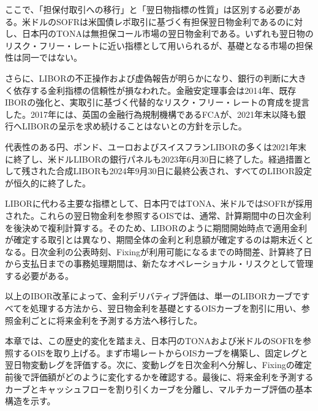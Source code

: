 \documentclass[
  letterpaper,
  DIV=11,
  numbers=noendperiod]{scrreprt}
\newenvironment{Shaded}{\begin{snugshade}}{\end{snugshade}}
\newcommand{\AttributeTok}[1]{\textcolor[rgb]{0.40,0.45,0.13}{#1}}
\newcommand{\ConstantTok}[1]{\textcolor[rgb]{0.56,0.35,0.01}{#1}}
\newcommand{\FunctionTok}[1]{\textcolor[rgb]{0.28,0.35,0.67}{#1}}
\newcommand{\NormalTok}[1]{\textcolor[rgb]{0.00,0.23,0.31}{#1}}
\newcommand{\SpecialCharTok}[1]{\textcolor[rgb]{0.37,0.37,0.37}{#1}}
\newcommand{\StringTok}[1]{\textcolor[rgb]{0.13,0.47,0.30}{#1}}
\begin{document}
ここで、「担保付取引への移行」と「翌日物指標の性質」は区別する必要がある。米ドルのSOFRは米国債レポ取引に基づく有担保翌日物金利であるのに対し、日本円のTONAは無担保コール市場の翌日物金利である。いずれも翌日物のリスク・フリー・レートに近い指標として用いられるが、基礎となる市場の担保性は同一ではない。

さらに、LIBORの不正操作および虚偽報告が明らかになり、銀行の判断に大きく依存する金利指標の信頼性が損なわれた。金融安定理事会は2014年、既存IBORの強化と、実取引に基づく代替的なリスク・フリー・レートの育成を提言した。2017年には、英国の金融行為規制機構であるFCAが、2021年末以降も銀行へLIBORの呈示を求め続けることはないとの方針を示した。

代表性のある円、ポンド、ユーロおよびスイスフランLIBORの多くは2021年末に終了し、米ドルLIBORの銀行パネルも2023年6月30日に終了した。経過措置として残された合成LIBORも2024年9月30日に最終公表され、すべてのLIBOR設定が恒久的に終了した。

LIBORに代わる主要な指標として、日本円ではTONA、米ドルではSOFRが採用された。これらの翌日物金利を参照するOISでは、通常、計算期間中の日次金利を後決めで複利計算する。そのため、LIBORのように期間開始時点で適用金利が確定する取引とは異なり、期間全体の金利と利息額が確定するのは期末近くとなる。日次金利の公表時刻、Fixingが利用可能になるまでの時間差、計算終了日から支払日までの事務処理期間は、新たなオペレーショナル・リスクとして管理する必要がある。

以上のIBOR改革によって、金利デリバティブ評価は、単一のLIBORカーブですべてを処理する方法から、翌日物金利を基礎とするOISカーブを割引に用い、参照金利ごとに将来金利を予測する方法へ移行した。

本章では、この歴史的変化を踏まえ、日本円のTONAおよび米ドルのSOFRを参照するOISを取り上げる。まず市場レートからOISカーブを構築し、固定レグと翌日物変動レグを評価する。次に、変動レグを日次金利へ分解し、Fixingの確定前後で評価額がどのように変化するかを確認する。最後に、将来金利を予測するカーブとキャッシュフローを割り引くカーブを分離し、マルチカーブ評価の基本構造を示す。

\begin{Shaded}
\end{Shaded}
\end{document}

